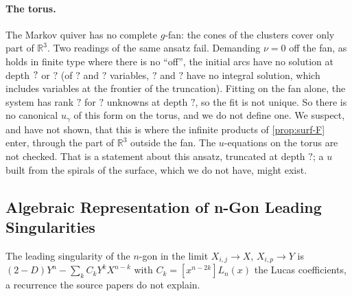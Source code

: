 \documentclass[11pt,a4paper]{article}
\newcommand{\SSSfUTorusVarsA}{?}\newcommand{\SSSfUTorusUnsolvedA}{?}\newcommand{\SSSfUTorusDepthB}{?}
\newcommand{\SSSfUTorusVarsB}{?}\newcommand{\SSSfUTorusUnsolvedB}{?}\newcommand{\SSSfUTorusRankB}{?}
\newcommand{\SSSfUTorusUnkB}{?}
\newcommand{\RR}{\mathbb{R}}
\theoremstyle{plain}
\theoremstyle{definition}
\begin{document}
\paragraph{The torus.} The Markov quiver has no complete $g$-fan: the cones of the clusters cover only part of $\RR^3$. Two readings of the same ansatz fail. Demanding $\nu=0$ off the fan, as holds in finite type where there is no ``off'', the initial arcs
have no solution at depth $?$ or $\SSSfUTorusDepthB$ (of $\SSSfUTorusVarsA$ and $\SSSfUTorusVarsB$ variables, $\SSSfUTorusUnsolvedA$ and $\SSSfUTorusUnsolvedB$ have no integral solution, which includes variables at the frontier of the truncation).
Fitting on the fan alone, the system has rank $\SSSfUTorusRankB$ for $\SSSfUTorusUnkB$ unknowns at depth $\SSSfUTorusDepthB$, so the fit is not unique. So there is no canonical $u_\gamma$ of this form on the torus, and we do not define one.
We suspect, and have not shown, that this is where the infinite products of \cref{prop:surf-F} enter, through the part of $\RR^3$ outside the fan. The $u$-equations on the torus are not checked. That is a statement about this ansatz, truncated at depth $\SSSfUTorusDepthB$; a $u$
built from the spirals of the surface, which we do not have, might exist.

\subsection{Algebraic Representation of n-Gon Leading Singularities}
\label{sec:lucas-trace}

The leading singularity of the $n$-gon in the limit $X_{i,j}\to X$, $X_{i,p}\to Y$ is $(2-D)Y^n-\sum_kC_kY^kX^{n-k}$ with $C_k=[x^{n-2k}]L_n(x)$ the Lucas
coefficients, a recurrence the source papers do not explain.
\end{document}
